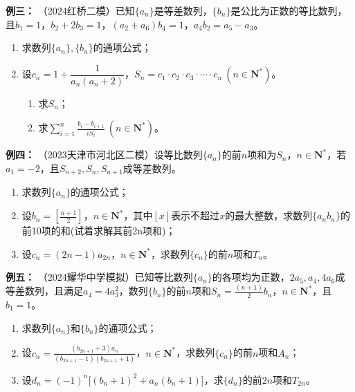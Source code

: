 \documentclass{article}
\begin{document}
\newpage

\noindent\textbf{例三： }（2024红桥二模）已知$\{a_n\}$是等差数列，$\{b_n\}$是公比为正数的等比数列，且$b_1=1$，$b_2+2b_3=1$，$(a_2+a_6)b_4=1$，$a_4b_2=a_5-a_3$。

\begin{enumerate}[label=(\Roman*)]
    \item 求数列$\{a_n\},\{b_n\}$的通项公式；
    
    \item 设$c_n=1+\dfrac{1}{a_n(a_n+2)}$，$S_n=c_1 \cdot c_2 \cdot c_3 \cdot \cdots \cdot c_n\ (n\in\mathbf{N}^*)$。
    
    \begin{enumerate}[label=(\roman*)]
        \item 求$S_n$；
        \item 求$\displaystyle\sum_{i=1}^n \frac{b_i - b_{i+1}}{iS_i}\ (n\in\mathbf{N}^*)$。
    \end{enumerate}
\end{enumerate}
\vspace{15\baselineskip}

\noindent\textbf{例四： }（2023天津市河北区二模）设等比数列$\{a_n\}$的前$n$项和为$S_n$，$n\in\mathbf{N}^*$，若$a_1=-2$，且$S_{n+2},S_n,S_{n+1}$成等差数列。

\begin{enumerate}[label=(\Roman*)]
    \item 求数列$\{a_n\}$的通项公式；
    
    \item 设$b_n=\left[\frac{n+1}{2}\right]$，$n\in\mathbf{N}^*$，其中$\left[x\right]$表示不超过$x$的最大整数，求数列$\{a_n b_n\}$的前10项的和(试着求解其前2n项和)；
    
    \item 设$c_n=(2n-1)a_{2n}$，$n\in\mathbf{N}^*$，求数列$\{c_n\}$的前$n$项和$T_n$。
\end{enumerate}

\newpage

\noindent\textbf{例五： }（2024耀华中学模拟）已知等比数列$\{a_n\}$的各项均为正数，$2a_5,a_4,4a_6$成等差数列，且满足$a_4=4a_3^2$，数列$\{b_n\}$的前$n$项和$S_n=\frac{(n+1)}{2}b_n$，$n\in\mathbf{N}^*$，且$b_1=1$。

\begin{enumerate}[label=(\Roman*)]
    \item 求数列$\{a_n\}$和$\{b_n\}$的通项公式；
    
    \item 设$c_n=\frac{(b_{2n+1}+3)a_n}{(b_{2n+1}-1)(b_{2n+1}+1)}$，$n\in\mathbf{N}^*$，求数列$\{c_n\}$的前$n$项和$A_n$；
    
    \item 设$d_n=(-1)^n\big[(b_n+1)^2+a_n(b_n+1)\big]$，求$\{d_n\}$的前$2n$项和$T_{2n}$。
\end{enumerate}
\vspace{15\baselineskip}
\end{document}
